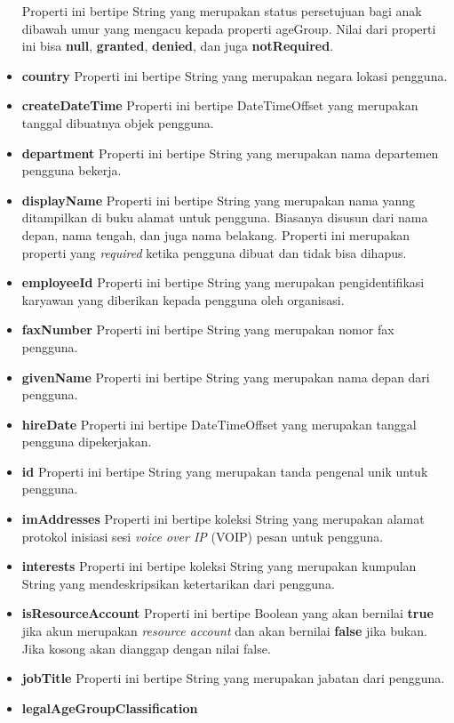 \begin{itemize}
	Properti ini bertipe String yang merupakan status persetujuan bagi anak dibawah umur yang mengacu kepada properti ageGroup. Nilai dari properti ini bisa \textbf{null}, \textbf{granted}, \textbf{denied}, dan juga \textbf{notRequired}. 
	\item \textbf{country}
	Properti ini bertipe String yang merupakan negara lokasi pengguna.
	\item \textbf{createDateTime}
	Properti ini bertipe DateTimeOffset yang merupakan tanggal dibuatnya objek pengguna.
	\item \textbf{department}
	Properti ini bertipe String yang merupakan nama departemen pengguna bekerja.
	\item \textbf{displayName}
	Properti ini bertipe String yang merupakan nama yanng ditampilkan di buku alamat untuk pengguna. Biasanya disusun dari nama depan, nama tengah, dan juga nama belakang. Properti ini merupakan properti yang \textit{required} ketika pengguna dibuat dan tidak bisa dihapus. 
	 \item \textbf{employeeId}
	Properti ini bertipe String yang merupakan pengidentifikasi karyawan yang diberikan kepada pengguna oleh organisasi.
	\item \textbf{faxNumber}
	Properti ini bertipe String yang merupakan nomor fax pengguna.
	\item \textbf{givenName}
	Properti ini bertipe String yang merupakan nama depan dari pengguna.
	\item \textbf{hireDate}
	Properti ini bertipe DateTimeOffset yang merupakan tanggal pengguna dipekerjakan.
	\item \textbf{id}
	Properti ini bertipe String yang merupakan tanda pengenal unik untuk pengguna.
	\item \textbf{imAddresses}
	Properti ini bertipe koleksi String yang merupakan alamat protokol inisiasi sesi \textit{voice over IP} (VOIP) pesan untuk pengguna.
	\item \textbf{interests}
	Properti ini bertipe koleksi String yang merupakan kumpulan String yang mendeskripsikan ketertarikan dari pengguna.
	\item \textbf{isResourceAccount}
	Properti ini bertipe Boolean yang akan bernilai \textbf{true} jika akun merupakan \textit{resource account} dan akan bernilai \textbf{false} jika bukan. Jika kosong akan dianggap dengan nilai false.
	\item \textbf{jobTitle}
	Properti ini bertipe String yang merupakan jabatan dari pengguna.
	\item \textbf{legalAgeGroupClassification}

\end{itemize}
